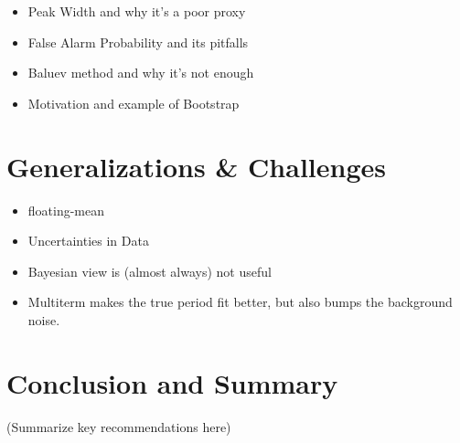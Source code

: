 \documentclass[preprint]{aastex}
\newcommand{\sectlabel}[1]{\label{sect:#1}}
\begin{document}
\begin{itemize}
  \item Peak Width and why it's a poor proxy
  \item False Alarm Probability and its pitfalls
  \item Baluev method and why it's not enough
  \item Motivation and example of Bootstrap
\end{itemize}


\section{Generalizations \& Challenges}
\sectlabel{generalizations}

\begin{itemize}
\item floating-mean
\item Uncertainties in Data
\item Bayesian view is (almost always) not useful
\item Multiterm makes the true period fit better, but also bumps the background noise.
\end{itemize}


\section{Conclusion and Summary}

(Summarize key recommendations here)



\end{document}
